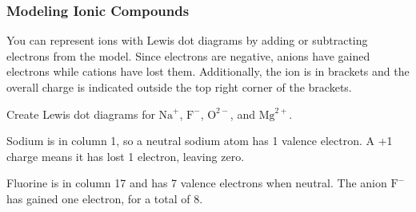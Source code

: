 \subsubsection{Modeling Ionic Compounds}
You can represent ions with Lewis dot diagrams by adding or subtracting electrons 
from the model. Since electrons are negative, anions have gained electrons while 
cations have lost them. Additionally, the ion is in brackets and the overall 
charge is indicated outside the top right corner of the brackets. 

\begin{Worked}
\begin{Problem}
Create Lewis dot diagrams for $\text{Na}^{+}$, $\text{F}^{-}$, 
$\text{O}^{2-}$, and $\text{Mg}^{2+}$.
\end{Problem}
\begin{Solution}
Sodium is in column 1, so a neutral sodium atom has 1 valence 
electron. A +1 charge means it has lost 1 electron, leaving zero.

\begin{center}
\end{center}

Fluorine is in column 17 and has 7 valence electrons when neutral. The anion 
$\text{F}^-$ has gained one electron, for a total of 8. 

\begin{center}
\end{center}


\end{Solution}
\end{Worked}
